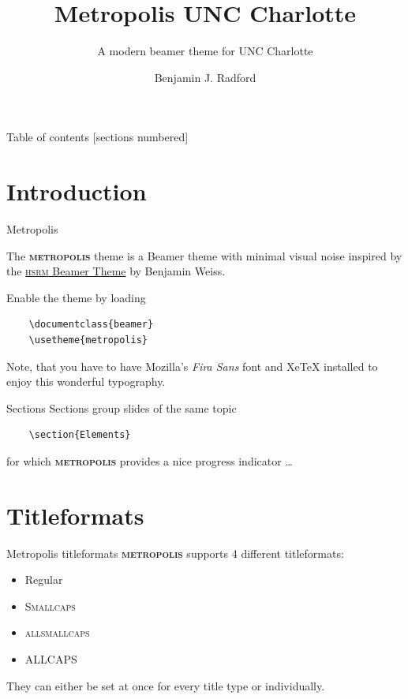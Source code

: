 \documentclass[10pt]{beamer}
\title{Metropolis UNC Charlotte}
\subtitle{A modern beamer theme for UNC Charlotte}
\date{}
\author{Benjamin J. Radford}
\institute{University of North Carolina at Charlotte}
\newcommand{\themename}{\textbf{\textsc{metropolis}}\xspace}
\begin{document}
\maketitle

\begin{frame}{Table of contents}
  [sections numbered]
  \tableofcontents%
\end{frame}

\section[Intro]{Introduction}

\begin{frame}[fragile]{Metropolis}

  The \themename theme is a Beamer theme with minimal visual noise
  inspired by the \href{https://github.com/hsrmbeamertheme/hsrmbeamertheme}{\textsc{hsrm} Beamer
  Theme} by Benjamin Weiss.

  Enable the theme by loading

  \begin{verbatim}    \documentclass{beamer}
    \usetheme{metropolis}\end{verbatim}

  Note, that you have to have Mozilla's \emph{Fira Sans} font and XeTeX
  installed to enjoy this wonderful typography.
\end{frame}
\begin{frame}[fragile]{Sections}
  Sections group slides of the same topic

  \begin{verbatim}    \section{Elements}\end{verbatim}

  for which \themename provides a nice progress indicator \ldots
  
\end{frame}

\section{Titleformats}

\begin{frame}{Metropolis titleformats}
	\themename supports 4 different titleformats:
	\begin{itemize}
		\item Regular
		\item \textsc{Smallcaps}
		\item \textsc{allsmallcaps}
		\item ALLCAPS
	\end{itemize}
	They can either be set at once for every title type or individually.
\end{frame}
\end{document}
